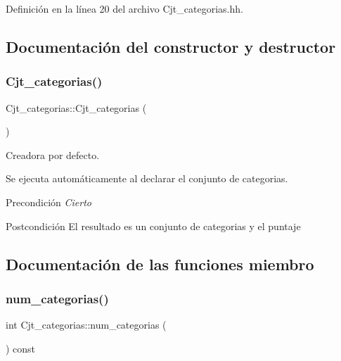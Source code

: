 Definición en la línea 20 del archivo Cjt\+\_\+categorias.\+hh.



\subsection{Documentación del constructor y destructor}
\mbox{\label{class_cjt__categorias_acb1bba449ac618047f1ac5f9f7756ec1}} 
\subsubsection{\texorpdfstring{Cjt\+\_\+categorias()}{Cjt\_categorias()}}
{\footnotesize\ttfamily Cjt\+\_\+categorias\+::\+Cjt\+\_\+categorias (\begin{DoxyParamCaption}{ }\end{DoxyParamCaption})}



Creadora por defecto. 

Se ejecuta automáticamente al declarar el conjunto de categorias. \begin{DoxyPrecond}{Precondición}
{\itshape Cierto} 
\end{DoxyPrecond}
\begin{DoxyPostcond}{Postcondición}
El resultado es un conjunto de categorias y el puntaje 
\end{DoxyPostcond}


\subsection{Documentación de las funciones miembro}
\mbox{\label{class_cjt__categorias_a8d99bf913eb3aaf562e5a086faaae517}} 
\subsubsection{\texorpdfstring{num\+\_\+categorias()}{num\_categorias()}}
{\footnotesize\ttfamily int Cjt\+\_\+categorias\+::num\+\_\+categorias (\begin{DoxyParamCaption}{ }\end{DoxyParamCaption}) const}



